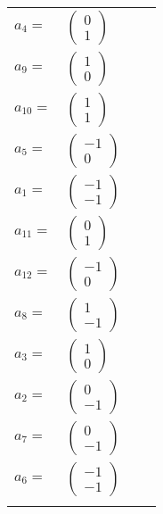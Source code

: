 \documentclass[1p]{elsarticle_modified}
\theoremstyle{definition}
\begin{document}
\begin{tabular}{m{7pt} m{180pt} m{7pt} m{180pt} }
\flushright $a_{4}=$&$\begin{pmatrix}0\\1\end{pmatrix}$ \\
\flushright $a_{9}=$&$\begin{pmatrix}1\\0\end{pmatrix}$ \\
\flushright $a_{10}=$&$\begin{pmatrix}1\\1\end{pmatrix}$ \\
\flushright $a_{5}=$&$\begin{pmatrix}-1\\0\end{pmatrix}$ \\
\flushright $a_{1}=$&$\begin{pmatrix}-1\\-1\end{pmatrix}$ \\
\flushright $a_{11}=$&$\begin{pmatrix}0\\1\end{pmatrix}$ \\
\flushright $a_{12}=$&$\begin{pmatrix}-1\\0\end{pmatrix}$ \\
\flushright $a_{8}=$&$\begin{pmatrix}1\\-1\end{pmatrix}$ \\
\flushright $a_{3}=$&$\begin{pmatrix}1\\0\end{pmatrix}$ \\
\flushright $a_{2}=$&$\begin{pmatrix}0\\-1\end{pmatrix}$ \\
\flushright $a_{7}=$&$\begin{pmatrix}0\\-1\end{pmatrix}$ \\
\flushright $a_{6}=$&$\begin{pmatrix}-1\\-1\end{pmatrix}$\\&\end{tabular}
\end{document}

